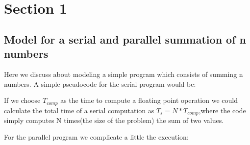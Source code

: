 \documentclass[11pt]{scrartcl} %
\begin{document}


\section{Section 1}

\subsection{Model for a serial and parallel summation of n numbers}
Here we discuss about modeling a simple program which consists of summing n numbers.
A simple pseudocode for the serial program would be:


\begin{algorithmic}

  \ENDFOR
{}
\end{algorithmic}

If we choose $T_{comp}$ as the time to compute a floating point operation we could calculate the total time of a serial computation as
$T_s = N * T_{comp}$,where the code simply computes N times(the size of the problem) the sum of two values.

For the parallel program we complicate a little the execution:

\begin{algorithmic}


		  \ENDFOR
		  \ENDFOR
\ENDIF
{}
	  \ENDFOR
\ENDIF
{}
\end{algorithmic}
\end{document}
